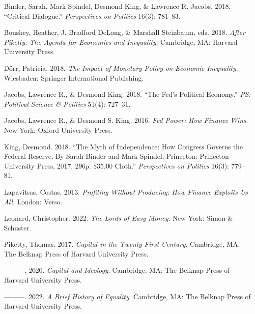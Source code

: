 \documentclass[
  11pt,
]{article}
\newlength{\cslhangindent}
\newlength{\cslentryspacingunit} %
\newenvironment{CSLReferences}[2] %
 {%
  \setlength{\parindent}{0pt}
  \ifodd #1
  \let\oldpar\par
  \def\par{\hangindent=\cslhangindent\oldpar}
  \fi
  \setlength{\parskip}{#2\cslentryspacingunit}
 }%
 {}
\begin{document}
\hypertarget{refs}{}
\begin{CSLReferences}{1}{0}
\leavevmode{}%
Binder, Sarah, Mark Spindel, Desmond King, \& Lawrence R. Jacobs. 2018.
{``Critical {Dialogue}.''} \emph{Perspectives on Politics} 16(3):
781--83.

\leavevmode{}%
Boushey, Heather, J. Bradford DeLong, \& Marshall Steinbaum, eds. 2018.
\emph{{After Piketty: The Agenda for Economics and Inequality}}.
{Cambridge, MA}: {Harvard University Press}.

\leavevmode{}%
Dörr, Patricia. 2018. \emph{The {Impact} of {Monetary Policy} on
{Economic Inequality}}. {Wiesbaden}: {Springer International
Publishing}.

\leavevmode{}%
Jacobs, Lawrence R., \& Desmond King. 2018. {``The {Fed}'s {Political
Economy}.''} \emph{PS: Political Science \& Politics} 51(4): 727--31.

\leavevmode{}%
Jacobs, Lawrence R., \& Desmond S. King. 2016. \emph{Fed Power: How
Finance Wins}. {New York}: {Oxford University Press}.

\leavevmode{}%
King, Desmond. 2018. {``The {Myth} of {Independence}: {How Congress
Governs} the {Federal Reserve}. {By Sarah Binder} and {Mark Spindel}.
{Princeton}: {Princeton University Press}, 2017. 296p. \$35.00 Cloth.''}
\emph{Perspectives on Politics} 16(3): 779--81.

\leavevmode{}%
Lapavitsas, Costas. 2013. \emph{Profiting Without Producing: How Finance
Exploits Us All}. {London}: {Verso}.

\leavevmode{}%
Leonard, Christopher. 2022. \emph{The {Lords} of {Easy Money}}. {New
York}: {Simon \& Schuster}.

\leavevmode{}%
Piketty, Thomas. 2017. \emph{Capital in the Twenty-First Century}.
{Cambridge, MA}: {The Belknap Press of Harvard University Press}.

\leavevmode{}%
---------. 2020. \emph{Capital and {Ideology}}. {Cambridge, MA}: {The
Belknap Press of Harvard University Press}.

\leavevmode{}%
---------. 2022. \emph{A Brief History of Equality}. {Cambridge, MA}:
{The Belknap Press of Harvard University Press}.


\end{CSLReferences}
\end{document}
